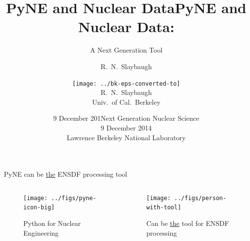 \documentclass[xcolor=x11names,compress]{beamer}
\title{PyNE and Nuclear Data}
\author{R.\ N.\ Slaybaugh}
\date{9 December 201}
\renewcommand{\(}{\begin{columns}}
\renewcommand{\)}{\end{columns}}
\newcommand{\<}[1]{\begin{column}{#1}}
\renewcommand{\>}{\end{column}}
\begin{document}
\begin{frame}
\title{PyNE and Nuclear Data:}
\subtitle{A Next Generation Tool}
\author{
\texttt{[image: ../bk-eps-converted-to]}\\R.\ N.\ Slaybaugh \\ Univ.\ of Cal.\ Berkeley}

\date{Next Generation Nuclear Science\\ 9 December 2014\\ Lawrence Berkeley National Laboratory}
\titlepage
\end{frame}

\begin{frame}{PyNE can be \underline{the} ENSDF processing tool}

	\begin{columns}
  	\begin{column}{0.45\textwidth}
 	   \begin{center}
 	   \begin{figure}
       \texttt{[image: ../figs/pyne-icon-big]}
       \caption{Python for Nuclear Engineering}
	   \end{figure}
 	   \end{center}
  	\end{column}
 	\begin{column}{0.45\textwidth}
 	   \begin{center}
 	   \begin{figure}
       \texttt{[image: ../figs/person-with-tool]}
       \caption{Can be \underline{the} tool for ENSDF processing}
	   \end{figure}
 	   \end{center}
  	\end{column}
	\end{columns}

\end{frame}
\end{document}
